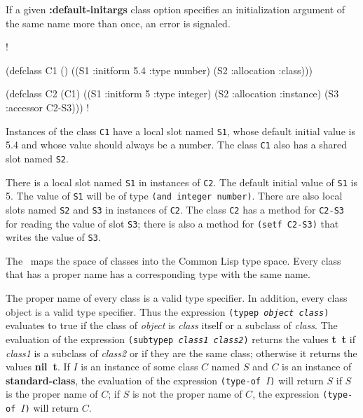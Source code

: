 If a given {\bf :default-initargs} class option specifies an
initialization argument of the same name more than once, an
error is signaled.

\endsubSection%


\screen!

(defclass C1 () 
    ((S1 :initform 5.4 :type number) 
     (S2 :allocation :class)))

(defclass C2 (C1) 
    ((S1 :initform 5 :type integer)
     (S2 :allocation :instance)
     (S3 :accessor C2-S3)))
\endscreen!

Instances of the class {\tt C1} have a local slot named {\tt S1}, whose default
initial value is 5.4 and whose value should always be a number.
The class {\tt C1} also has a shared slot named {\tt S2}.

There is a local slot named {\tt S1} in instances of {\tt C2}.  The
default initial value of {\tt S1} is 5.  The value of {\tt S1} will be
of type {\tt (and integer number)}.  There are also local slots named
{\tt S2} and {\tt S3} in instances of {\tt C2}.  The class {\tt C2}
has a method for {\tt C2-S3} for reading the value of slot {\tt S3};
there is also a method for {\tt (setf C2-S3)} that writes the
value of {\tt S3}.

\endsubSection%
\endSection%


The \CLOS\ maps the space of classes into the Common Lisp type space.
Every class that has a proper name has a corresponding type with the same 
name.  

The proper name of every class is a valid type specifier.  In
addition, every class object is a valid type specifier.  Thus the
expression {\tt (typep {\it object class\/})} evaluates to true if the
class of {\it object\/} is {\it class\/} itself or a subclass of {\it
class}.  The evaluation of the expression {\tt (subtypep {\it class1
class2\/})} returns the values {\bf t~t} if {\it class1\/} is a
subclass of {\it class2\/} or if they are the same class; otherwise it
returns the values {\bf nil~t}.  If $I$ is an instance of some class
$C$ named $S$ and $C$ is an instance of {\bf standard-class}, the
evaluation of the expression {\tt (type-of $I$\/)} will return $S$ if
$S$ is the proper name of $C$\negthinspace; if $S$ is not the proper
name of $C$\negthinspace, the expression {\tt (type-of $I$\/)} will
return $C$\negthinspace.


